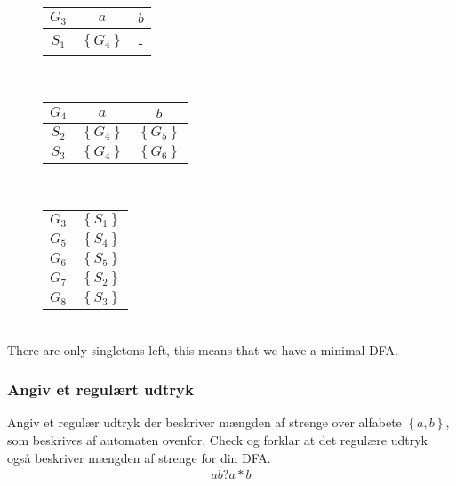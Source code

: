 \begin{figure}[!ht]\label{fig:mindfa:g3}
  \centering
  \begin{tabular}{c|cc}
    $G_3$ & $a$ & $b$\\\hline
    $S_1$ & $\left\{G_4\right\}$ & -
  \end{tabular}
\end{figure}\\
\begin{figure}[!ht]\label{fig:mindfa:g4}
  \centering
  \begin{tabular}{c|cc}
    $G_4$ & $a$ & $b$\\\hline
    $S_2$ & $\left\{G_4\right\}$ & $\left\{G_5\right\}$\\
    $S_3$ & $\left\{G_4\right\}$ & $\left\{G_6\right\}$
  \end{tabular}
\end{figure}\\
\begin{figure}[!ht]\label{fig:mindfa:newgs}
  \centering
  \begin{tabular}{c|c}
    $G_3$ & $\left\{S_1\right\}$\\
    $G_5$ & $\left\{S_4\right\}$\\
    $G_6$ & $\left\{S_5\right\}$\\
    $G_7$ & $\left\{S_2\right\}$\\
    $G_8$ & $\left\{S_3\right\}$\\
  \end{tabular}
\end{figure}\\
There are only singletons left, this means that we have a minimal DFA.
\subsubsection{Angiv et regulært udtryk}
Angiv et regulær udtryk der beskriver mængden af strenge over alfabete $\left\{a, b\right\}$, som beskrives af automaten ovenfor. Check og forklar at det regulære udtryk også beskriver mængden af strenge for din DFA.
\begin{align}
  ab?a*b
\end{align}